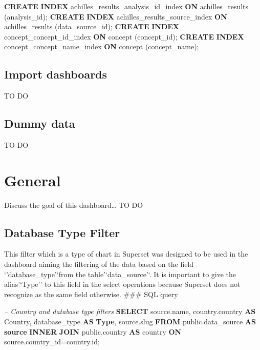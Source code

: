 \documentclass[]{book}
\newenvironment{Shaded}{\begin{snugshade}}{\end{snugshade}}
\newcommand{\KeywordTok}[1]{\textcolor[rgb]{0.13,0.29,0.53}{\textbf{#1}}}
\newcommand{\CommentTok}[1]{\textcolor[rgb]{0.56,0.35,0.01}{\textit{#1}}}
\newcommand{\NormalTok}[1]{#1}
\begin{document}
\begin{enumerate}
\begin{Shaded}
\begin{Highlighting}[]
\KeywordTok{CREATE} \KeywordTok{INDEX}\NormalTok{ achilles_results_analysis_id_index }\KeywordTok{ON} 
\NormalTok{    achilles_results (analysis_id);}
\KeywordTok{CREATE} \KeywordTok{INDEX}\NormalTok{ achilles_results_source_index }\KeywordTok{ON}\NormalTok{ achilles_results }
\NormalTok{    (data_source_id);}
\KeywordTok{CREATE} \KeywordTok{INDEX}\NormalTok{ concept_concept_id_index }\KeywordTok{ON}\NormalTok{ concept (concept_id);}
\KeywordTok{CREATE} \KeywordTok{INDEX}\NormalTok{ concept_concept_name_index }\KeywordTok{ON}\NormalTok{ concept }
\NormalTok{    (concept_name);}
\end{Highlighting}
\end{Shaded}
\end{enumerate}

\section{Import dashboards}\label{import-dashboards}

TO DO

\section{Dummy data}\label{dummy-data}

TO DO

\chapter{General}\label{general}

Discuss the goal of this dashboard\ldots{} TO DO

\section{Database Type Filter}\label{database-type-filter}

This filter which is a type of chart in Superset was designed to be used
in the dashboard aiming the filtering of the data based on the field
`'database\_type'`from the table'`data\_source'`. It is important to
give the alias'`Type'' to this field in the select operations because
Superset does not recognize as the same field otherwise. \#\#\# SQL
query

\begin{Shaded}
\begin{Highlighting}[]
\CommentTok{--  Country and database type filters}
\KeywordTok{SELECT}\NormalTok{ source.name, }
\NormalTok{       country.country }\KeywordTok{AS}\NormalTok{ Country, }
\NormalTok{       database_type }\KeywordTok{AS} \KeywordTok{Type}\NormalTok{,}
\NormalTok{       source.slug}
\KeywordTok{FROM}\NormalTok{ public.data_source }\KeywordTok{AS} \KeywordTok{source} \KeywordTok{INNER} \KeywordTok{JOIN}\NormalTok{ public.country }
  \KeywordTok{AS}\NormalTok{ country }\KeywordTok{ON}\NormalTok{ source.country_id=country.id;}
\end{Highlighting}
\end{Shaded}
\end{document}

